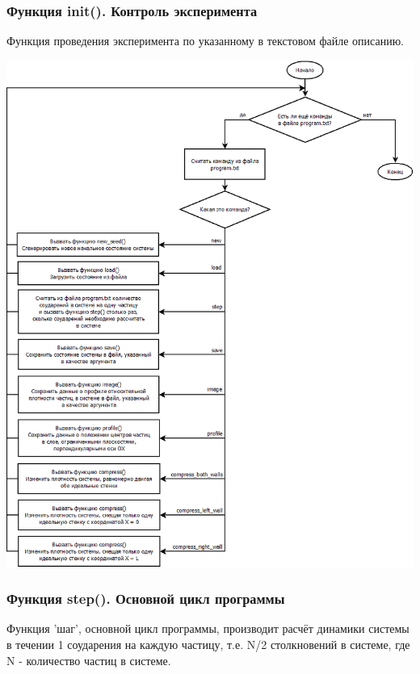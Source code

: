 \documentclass[a4paper]{article}
\begin{document}
\subsubsection{Функция init(). Контроль эксперимента }

Функция проведения эксперимента по указанному в
текстовом файле описанию.


\begin{center}
\includegraphics[scale=0.45]{init.png}
\end{center}

\newpage
\subsubsection{Функция step(). Основной цикл программы }

Функция 'шаг', основной цикл программы, производит расчёт динамики системы в течении 1 соударения на каждую частицу, т.е. N/2 столкновений в системе, где N - количество частиц в системе.
\end{document}
